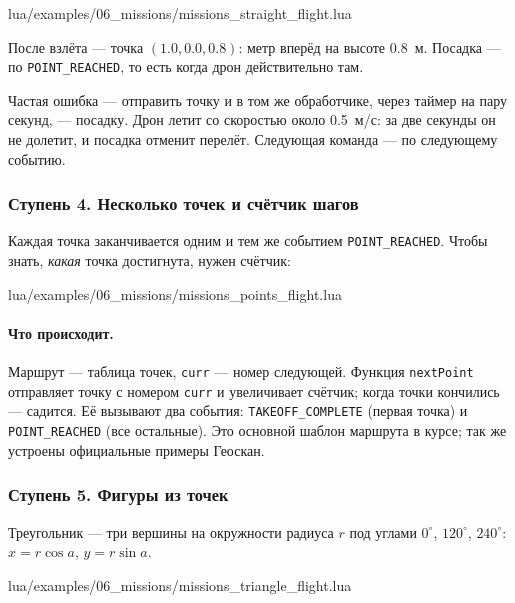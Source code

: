 \begin{codefile}{lua/examples/06_missions/missions_straight_flight.lua}
\end{codefile}

После взлёта --- точка $(1.0, 0.0, 0.8)$: метр вперёд на высоте 0.8~м. Посадка --- по \verb|POINT_REACHED|, то есть когда дрон действительно там.

\begin{warnbox}
Частая ошибка --- отправить точку и в том же обработчике, через таймер на пару секунд, --- посадку. Дрон летит со скоростью около 0.5~м/с: за две секунды он не долетит, и посадка отменит перелёт. Следующая команда --- по следующему событию.
\end{warnbox}

\subsubsection*{Ступень 4. Несколько точек и счётчик шагов}

Каждая точка заканчивается одним и тем же событием \verb|POINT_REACHED|. Чтобы знать, \emph{какая} точка достигнута, нужен счётчик:

\begin{codefile}{lua/examples/06_missions/missions_points_flight.lua}
\end{codefile}

\paragraph{Что происходит.} Маршрут --- таблица точек, \verb|curr| --- номер следующей. Функция \verb|nextPoint| отправляет точку с номером \verb|curr| и увеличивает счётчик; когда точки кончились --- садится. Её вызывают два события: \verb|TAKEOFF_COMPLETE| (первая точка) и \verb|POINT_REACHED| (все остальные). Это основной шаблон маршрута в курсе; так же устроены официальные примеры Геоскан.

\subsubsection*{Ступень 5. Фигуры из точек}

Треугольник --- три вершины на окружности радиуса $r$ под углами $0^\circ$, $120^\circ$, $240^\circ$: $x = r\cos a$, $y = r\sin a$.

\begin{codefile}{lua/examples/06_missions/missions_triangle_flight.lua}
\end{codefile}

